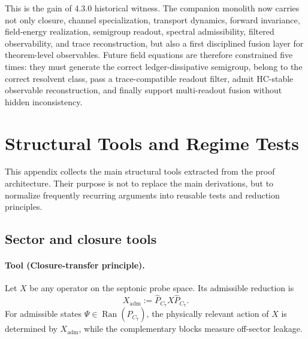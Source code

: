 \documentclass[12pt,a4paper]{article}
\newcommand{\docversion}{4.3.0 historical witness}
\begin{document}
This is the gain of \docversion. The companion monolith now carries not only
closure, channel specialization, transport dynamics, forward invariance,
field-energy realization, semigroup readout, spectral admissibility, filtered
observability, and trace reconstruction, but also a first disciplined fusion
layer for theorem-level observables. Future field equations are therefore
constrained five times: they must generate the correct ledger-dissipative
semigroup, belong to the correct resolvent class, pass a trace-compatible readout
filter, admit HC-stable observable reconstruction, and finally support
multi-readout fusion without hidden inconsistency.



\section{Structural Tools and Regime Tests}
\label{app:structural-tools-regime-tests}

This appendix collects the main structural tools extracted from the
proof architecture. Their purpose is not to replace the main
derivations, but to normalize frequently recurring arguments into
reusable tests and reduction principles.

\subsection*{Sector and closure tools}

\paragraph{Tool (Closure-transfer principle).}
Let $X$ be any operator on the septonic probe space. Its admissible
reduction is
\[
 X_{\mathrm{adm}} := \hat{P}_{C_7} X \hat{P}_{C_7}.
\]
For admissible states $\Psi \in \operatorname{Ran}(\hat{P}_{C_7})$, the
physically relevant action of $X$ is determined by $X_{\mathrm{adm}}$,
while the complementary blocks measure off-sector leakage.
\end{document}
